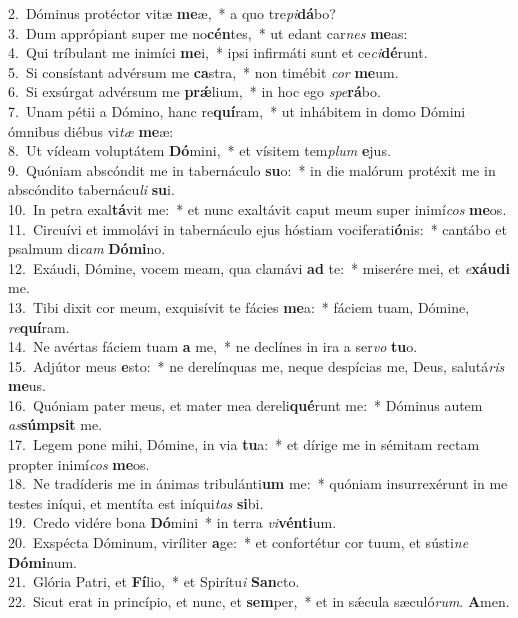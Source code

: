{2.~}Dóminus protéctor vitæ \textbf{me}æ,~* a quo tre\textit{pi}\textbf{dá}bo?\\
{3.~}Dum apprópiant super me no\textbf{cén}tes,~* ut edant car\textit{nes} \textbf{me}as:\\
{4.~}Qui tríbulant me inimíci \textbf{me}i,~* ipsi infirmáti sunt et ce\textit{ci}\textbf{dé}runt.\\
{5.~}Si consístant advérsum me \textbf{ca}stra,~* non timébit \textit{cor} \textbf{me}um.\\
{6.~}Si exsúrgat advérsum me \textbf{prǽ}lium,~* in hoc ego \textit{spe}\textbf{rá}bo.\\
{7.~}Unam pétii a Dómino, hanc re\textbf{quí}ram,~* ut inhábitem in domo Dómini ómnibus diébus vi\textit{tæ} \textbf{me}æ:\\
{8.~}Ut vídeam voluptátem \textbf{Dó}mini,~* et vísitem tem\textit{plum} \textbf{e}jus.\\
{9.~}Quóniam abscóndit me in tabernáculo \textbf{su}o:~* in die malórum protéxit me in abscóndito tabernácu\textit{li} \textbf{su}i.\\
{10.~}In petra exal\textbf{tá}vit me:~* et nunc exaltávit caput meum super inimí\textit{cos} \textbf{me}os.\\
{11.~}Circuívi et immolávi in tabernáculo ejus hóstiam vociferati\textbf{ó}nis:~* cantábo et psalmum di\textit{cam} \textbf{Dó}\textbf{mi}no.\\
{12.~}Exáudi, Dómine, vocem meam, qua clamávi \textbf{ad} te:~* miserére mei, et \textit{e}\textbf{xáu}\textbf{di} me.\\
{13.~}Tibi dixit cor meum, exquisívit te fácies \textbf{me}a:~* fáciem tuam, Dómine, \textit{re}\textbf{quí}ram.\\
{14.~}Ne avértas fáciem tuam \textbf{a} me,~* ne declínes in ira a ser\textit{vo} \textbf{tu}o.\\
{15.~}Adjútor meus \textbf{e}sto:~* ne derelínquas me, neque despícias me, Deus, salutá\textit{ris} \textbf{me}us.\\
{16.~}Quóniam pater meus, et mater mea dereli\textbf{qué}runt me:~* Dóminus autem \textit{as}\textbf{súm}\textbf{psit} me.\\
{17.~}Legem pone mihi, Dómine, in via \textbf{tu}a:~* et dírige me in sémitam rectam propter inimí\textit{cos} \textbf{me}os.\\
{18.~}Ne tradíderis me in ánimas tribulánti\textbf{um} me:~* quóniam insurrexérunt in me testes iníqui, et mentíta est iníqui\textit{tas} \textbf{si}bi.\\
{19.~}Credo vidére bona \textbf{Dó}mini~* in terra \textit{vi}\textbf{vén}\textbf{ti}um.\\
{20.~}Exspécta Dóminum, viríliter \textbf{a}ge:~* et confortétur cor tuum, et sústi\textit{ne} \textbf{Dó}\textbf{mi}num.\\
{21.~}Glória Patri, et \textbf{Fí}lio,~* et Spirítu\textit{i} \textbf{San}cto.\\
{22.~}Sicut erat in princípio, et nunc, et \textbf{sem}per,~* et in sǽcula sæculó\textit{rum}. \textbf{A}men.\\

